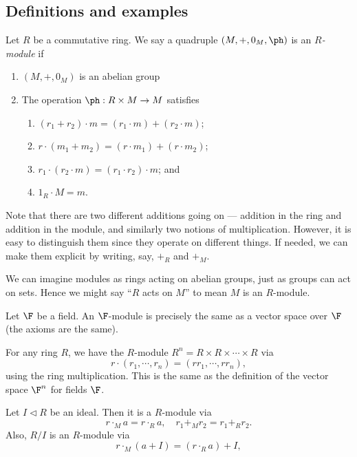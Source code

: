 \documentclass[a4paper]{article}
\begin{document}
\subsection{Definitions and examples}
\begin{defi}[Module]
  Let $R$ be a commutative ring. We say a quadruple $(M, +, 0_M, \ph)$ is an \emph{$R$-module} if
  \begin{enumerate}
    \item $(M, +, 0_M)$ is an abelian group
    \item The operation $\ph: R \times M \to M$ satisfies
      \begin{enumerate}
        \item $(r_1 + r_2) \cdot m = (r_1 \cdot m) + (r_2 \cdot m)$;
        \item $r\cdot (m_1 + m_2) = (r\cdot m_1) + (r\cdot m_2)$;
        \item $r_1 \cdot (r_2 \cdot m) = (r_1 \cdot r_2) \cdot m$; and
        \item $1_R \cdot M = m$.
      \end{enumerate}
  \end{enumerate}
\end{defi}
Note that there are two different additions going on --- addition in the ring and addition in the module, and similarly two notions of multiplication. However, it is easy to distinguish them since they operate on different things. If needed, we can make them explicit by writing, say, $+_R$ and $+_M$.

We can imagine modules as rings acting on abelian groups, just as groups can act on sets. Hence we might say ``$R$ acts on $M$'' to mean $M$ is an $R$-module.

\begin{eg}
  Let $\F$ be a field. An $\F$-module is precisely the same as a vector space over $\F$ (the axioms are the same).
\end{eg}

\begin{eg}
  For any ring $R$, we have the $R$-module $R^n = R \times R \times \cdots \times R$ via
  \[
    r\cdot (r_1, \cdots, r_n) = (rr_1, \cdots, rr_n),
  \]
  using the ring multiplication. This is the same as the definition of the vector space $\F^n$ for fields $\F$.
\end{eg}

\begin{eg}
  Let $I \lhd R$ be an ideal. Then it is a $R$-module via
  \[
    r \cdot_M a = r\cdot_R a,\quad r_1 +_M r_2 = r_1 +_R r_2.
  \]
  Also, $R/I$ is an $R$-module via
  \[
    r\cdot_M (a + I) = (r\cdot_R a) + I,
  \]
\end{eg}
\end{document}

